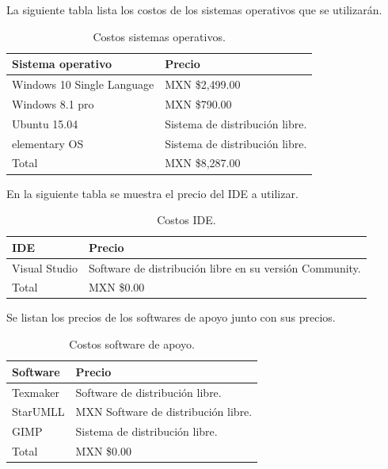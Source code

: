 \documentclass[12pt]{report}
\begin{document}
La siguiente tabla lista los costos de los sistemas operativos que se utilizarán.

\begin{table}[H]
\begin{center}
\begin{tabular}{|p{40mm}|p{40mm}|}
\hline
Sistema operativo & Precio \\
\hline \hline 
Windows 10 Single Language & MXN \$2,499.00\\
\hline
Windows 8.1 pro & MXN \$790.00\\
\hline
Ubuntu 15.04 & Sistema de distribución libre.\cite{preubu}\\
\hline
elementary OS & Sistema de distribución libre.\cite{preele}\\
\hline \hline
Total & MXN \$8,287.00\\
\hline
\end{tabular}
\caption{Costos sistemas operativos.}
\end{center}
\end{table}

En la siguiente tabla se muestra el precio del IDE a utilizar.
\begin{table}[H]
\begin{center}
\begin{tabular}{|p{40mm}|p{40mm}|}
\hline
IDE & Precio \\
\hline \hline 
Visual Studio & Software de distribución libre en su versión Community.\cite{visual}\\
\hline \hline
Total & MXN \$0.00\\
\hline
\end{tabular}
\caption{Costos IDE.}
\end{center}
\end{table}

Se listan los precios de los softwares de apoyo junto con sus precios.

\begin{table}[H]
\begin{center}
\begin{tabular}{|p{40mm}|p{40mm}|}
\hline
Software & Precio \\
\hline \hline 
Texmaker & Software de distribución libre.\cite{texm}\\
\hline
StarUMLL & MXN Software de distribución libre.\cite{star}\\
\hline
GIMP & Sistema de distribución libre.\cite{gimp}\\
\hline \hline
Total & MXN \$0.00\\
\hline
\end{tabular}
\caption{Costos software de apoyo.}
\end{center}
\end{table}
\end{document}
